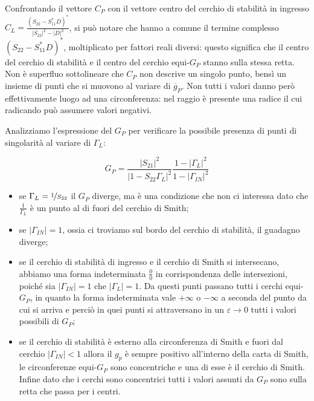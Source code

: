%	
Confrontando il vettore $C_P$ con il vettore centro del cerchio di stabilità in ingresso $C_L = \frac{(S_{22} - S_{11}^*D)^*}{|S_{22}|^2 - |D|^2}$, si può notare che hanno a comune il termine complesso $(S_{22} - S_{11}^*D)^*$, moltiplicato per fattori reali diversi: questo significa che il centro del cerchio di stabilità e il centro del cerchio equi-$G_P$ stanno sulla stessa retta.\\
Non è superfluo sottolineare che $C_P$ non descrive un singolo punto, bensì un insieme di punti che si muovono al variare di $\overline{g}_P$.
Non tutti i valori danno però effettivamente luogo ad una circonferenza: nel raggio è presente una radice il cui radicando può assumere valori negativi.

Analizziamo l'espressione del $G_P$ per verificare la possibile presenza di punti di singolarità al variare di $\Gamma_L$:

$$G_P = \frac{|S_{21}|^2}{|1-S_{22}\Gamma_L|^2}
\frac{1-|\Gamma_L|^2}{1-|\Gamma_{IN}|^2}$$

\begin{itemize}
	\item se $\Gamma_L = \nicefrac{1}{S_{22}}$ il $G_P$ diverge, ma è una condizione che non ci interessa dato che $\frac{1}{\Gamma_L}$ è un punto al di fuori del cerchio di Smith;
	\item se $|\Gamma_{IN}| = 1$, ossia ci troviamo sul bordo del cerchio di stabilità, il guadagno diverge;
	\item se il cerchio di stabilità di ingresso e il cerchio di Smith si intersecano, abbiamo una forma indeterminata $\frac{0}{0}$ in corrispondenza delle intersezioni, poiché sia  $|\Gamma_{IN}| = 1$ che  $|\Gamma_{L}| = 1$. Da questi punti passano tutti i cerchi equi-$G_P$, in quanto la forma indeterminata vale $+\infty$ o $-\infty$ a seconda del punto da cui si arriva e perciò in quei punti si attraversano in un $\varepsilon \rightarrow 0$ tutti i valori possibili di $G_P$;
	\item se il cerchio di stabilità è esterno alla circonferenza di Smith e fuori dal cerchio $|\Gamma_{IN}|<1$ allora il $g_p$ è sempre positivo all'interno della carta di Smith, le circonferenze equi-$G_P$ sono concentriche e una di esse è il cerchio di Smith. Infine dato che i cerchi sono concentrici tutti i valori assunti da $G_P$ sono sulla retta che passa per i centri.
\end{itemize}

